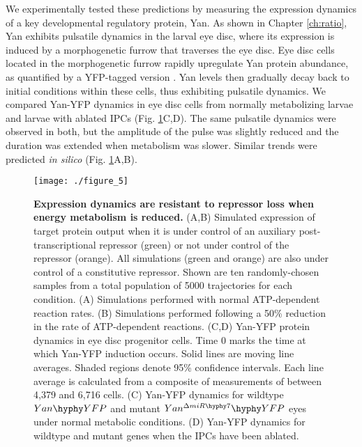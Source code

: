 We experimentally tested these predictions by measuring the expression dynamics of a key developmental regulatory protein, Yan. As shown in Chapter \ref{ch:ratio}, Yan exhibits pulsatile dynamics in the larval eye disc, where its expression is induced by a morphogenetic furrow that traverses the eye disc. Eye disc cells located in the morphogenetic furrow rapidly upregulate Yan protein abundance, as quantified by a YFP-tagged version \cite{Pelaez2015a}. Yan levels then gradually decay back to initial conditions within these cells, thus exhibiting pulsatile dynamics. We compared Yan-YFP dynamics in eye disc cells from normally metabolizing larvae and larvae with ablated IPCs (Fig. \ref{fig:metabolism:fig5}C,D). The same pulsatile dynamics were observed in both, but the amplitude of the pulse was slightly reduced and the duration was extended when metabolism was slower. Similar trends were predicted \textit{in silico} (Fig. \ref{fig:metabolism:fig5}A,B).

\begin{figure}[h!]
\centering
\texttt{[image: ./figure\_5]}
\caption[Expression dynamics are less affected when metabolism is reduced.]{\textbf{Expression dynamics are resistant to repressor loss when energy metabolism is reduced.} (A,B) Simulated expression of target protein output when it is under control of an auxiliary post-transcriptional repressor (green) or not under control of the repressor (orange). All simulations (green and orange) are also under control of a constitutive repressor. Shown are ten randomly-chosen samples from a total population of 5000 trajectories for each condition. (A) Simulations performed with normal ATP-dependent reaction rates. (B) Simulations performed following a 50\% reduction in the rate of ATP-dependent reactions. (C,D) Yan-YFP protein dynamics in eye disc progenitor cells. Time 0 marks the time at which Yan-YFP induction occurs. Solid lines are moving line averages. Shaded regions denote 95\% confidence intervals. Each line average is calculated from a composite of measurements of between 4,379 and 6,716 cells. (C) Yan-YFP dynamics for wildtype $Yan\hyphy YFP$ and mutant $Yan^{\Delta miR\hyphy  7}\hyphy YFP$ eyes under normal metabolic conditions. (D) Yan-YFP dynamics for wildtype and mutant genes when the IPCs have been ablated.}
\label{fig:metabolism:fig5}
\end{figure}

